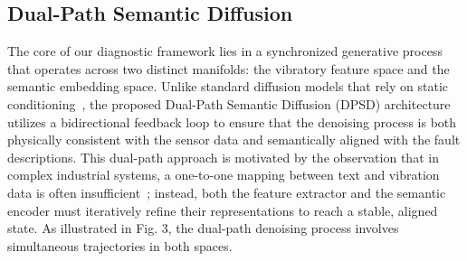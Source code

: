 \subsection{Dual-Path Semantic Diffusion}
\label{sec:dual_path}

The core of our diagnostic framework lies in a synchronized generative process that operates across two distinct manifolds: the vibratory feature space and the semantic embedding space. Unlike standard diffusion models that rely on static conditioning~\cite{song2020score,dhariwal2021diffusion}, the proposed Dual-Path Semantic Diffusion (DPSD) architecture utilizes a bidirectional feedback loop to ensure that the denoising process is both physically consistent with the sensor data and semantically aligned with the fault descriptions. This dual-path approach is motivated by the observation that in complex industrial systems, a one-to-one mapping between text and vibration data is often insufficient~\cite{fan2023frido}; instead, both the feature extractor and the semantic encoder must iteratively refine their representations to reach a stable, aligned state. As illustrated in Fig. 3, the dual-path denoising process involves simultaneous trajectories in both spaces.

